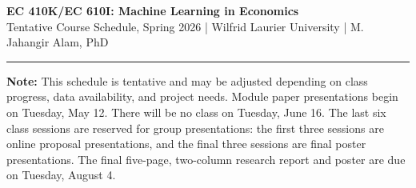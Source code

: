 \documentclass[11pt]{article}
\begin{document}
\pagestyle{empty}

\vspace*{-0.45in}

\begin{center}
{\large \textbf{\textcolor{sectioncolor}{EC 410K/EC 610I: Machine Learning in Economics}}} \\[-1pt]
{\small Tentative Course Schedule, Spring 2026 \quad | \quad Wilfrid Laurier University \quad | \quad M. Jahangir Alam, PhD} \\[-2pt]
\rule{\textwidth}{0.35pt}
\end{center}

\vspace{-0.18in}

{\scriptsize
\textbf{Note:} This schedule is tentative and may be adjusted depending on class progress, data availability, and project needs. Module paper presentations begin on Tuesday, May 12. There will be no class on Tuesday, June 16. The last six class sessions are reserved for group presentations: the first three sessions are online proposal presentations, and the final three sessions are final poster presentations. The final five-page, two-column research report and poster are due on Tuesday, August 4.
}

\vspace{0.04in}
\end{document}
